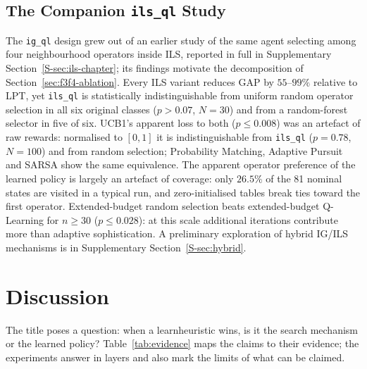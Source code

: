 \documentclass[final,3p,times,11pt,authoryear]{elsarticle}
\begin{document}




\subsection{The Companion \texttt{ils\_ql} Study}
\label{sec:ils-summary}

The \texttt{ig\_ql} design grew out of an earlier study of the same agent
selecting among four neighbourhood operators inside ILS, reported in full
in Supplementary Section~\ref{S-sec:ils-chapter}; its findings motivate the
decomposition of Section~\ref{sec:f3f4-ablation}. Every ILS variant reduces
GAP by $55$--$99\%$ relative to LPT, yet \texttt{ils\_ql} is statistically
indistinguishable from uniform random operator selection in all six
original classes ($p > 0.07$, $N=30$) and from a random-forest selector in
five of six. UCB1's apparent loss to both ($p \leq 0.008$) was an artefact
of raw rewards: normalised to $[0,1]$ it is indistinguishable from
\texttt{ils\_ql} ($p=0.78$, $N=100$) and from random selection; Probability
Matching, Adaptive Pursuit and SARSA show the same equivalence. The
apparent operator preference of the learned policy is largely an artefact
of coverage: only $26.5\%$ of the 81 nominal states are visited in a typical
run, and zero-initialised tables break ties toward the first operator.
Extended-budget random selection beats extended-budget Q-Learning for
$n \geq 30$ ($p \leq 0.028$): at this scale additional iterations
contribute more than adaptive sophistication. A preliminary exploration of
hybrid IG/ILS mechanisms is in Supplementary Section~\ref{S-sec:hybrid}.


\section{Discussion}
\label{sec:discussion}

The title poses a question: when a learnheuristic wins, is it the search
mechanism or the learned policy? Table~\ref{tab:evidence} maps the claims to their
evidence; the experiments answer in layers and also mark the limits of what can be
claimed.
\end{document}
